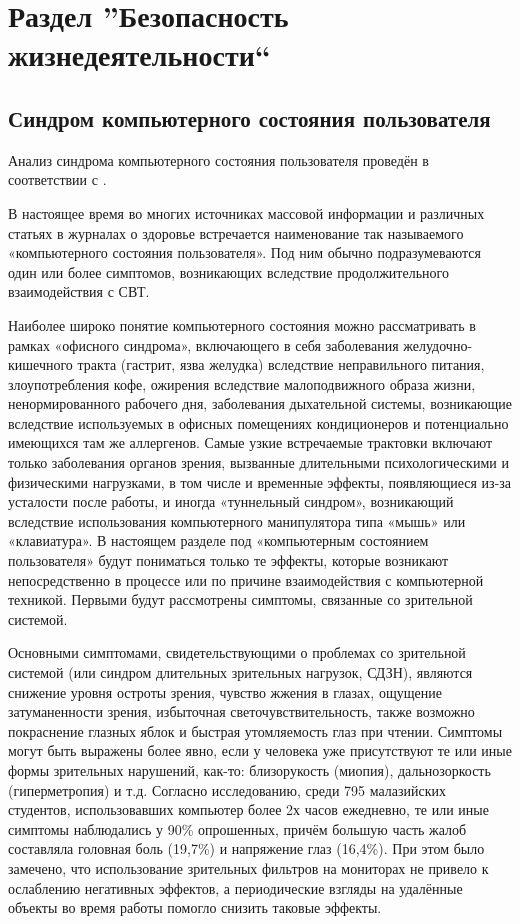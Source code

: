 \section {Раздел ''Безопасность жизнедеятельности``}
\subsection {Синдром компьютерного состояния пользователя}
Анализ синдрома компьютерного состояния пользователя проведён в соответствии с \cite{OFFICESYNDROME, COMPUTERVISION, WRISTPOSTURE, CARPALTUNNEL, SANPIN}.

В настоящее время во многих источниках массовой информации и различных статьях в журналах о здоровье встречается наименование так называемого «компьютерного состояния пользователя». Под ним обычно подразумеваются один или более симптомов, возникающих вследствие продолжительного взаимодействия с СВТ. 

Наиболее широко понятие компьютерного состояния можно рассматривать в рамках «офисного синдрома», включающего в себя заболевания желудочно-кишечного тракта  (гастрит, язва желудка) вследствие неправильного питания, злоупотребления кофе, ожирения вследствие малоподвижного образа жизни, ненормированного рабочего дня, заболевания дыхательной системы, возникающие вследствие используемых в офисных помещениях кондиционеров и потенциально имеющихся там же аллергенов\cite{OFFICESYNDROME}. Самые узкие встречаемые трактовки включают только заболевания органов зрения, вызванные длительными психологическими и физическими нагрузками, в том числе и временные эффекты, появляющиеся из-за усталости после работы, и иногда «туннельный синдром», возникающий вследствие использования компьютерного манипулятора типа «мышь» или «клавиатура». В настоящем разделе под «компьютерным состоянием пользователя» будут пониматься только те эффекты, которые возникают непосредственно в процессе или по причине взаимодействия с компьютерной техникой. Первыми будут рассмотрены симптомы, связанные со зрительной системой.

Основными симптомами, свидетельствующими о проблемах со зрительной системой (или синдром длительных зрительных нагрузок, СДЗН), являются снижение уровня остроты зрения, чувство жжения в глазах, ощущение затуманенности зрения, избыточная светочувствительность, также возможно покраснение глазных яблок и быстрая утомляемость глаз при чтении. Симптомы могут быть выражены более явно, если у человека уже присутствуют те или иные формы зрительных нарушений, как-то: близорукость (миопия), дальнозоркость (гиперметропия) и т.д. Согласно исследованию, среди 795 малазийских студентов, использовавших компьютер более 2х часов ежедневно, те или иные симптомы наблюдались у 90\% опрошенных, причём большую часть жалоб составляла головная боль (19,7\%) и напряжение глаз (16,4\%)\cite{COMPUTERVISION}. При  этом было замечено, что использование зрительных фильтров на мониторах не привело к ослаблению негативных эффектов, а периодические взгляды на удалённые объекты во время работы помогло снизить таковые эффекты. 

